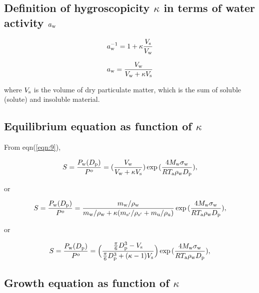 \documentclass[12pt]{article}
\begin{document}
\subsection{Definition of hygroscopicity $\kappa$ in terms of water activity $a_{\rm w}$}

\begin{equation}\label{eqn:17}
a_{\rm w}^{-1}=1+\kappa \frac{V_{\rm s}}{V_{\rm w}}
\end{equation}

\begin{equation}\label{eqn:18}
a_{\rm w}=\frac{V_{\rm w}}{V_{\rm w} + \kappa V_{\rm s}}
\end{equation}

where $V_{\rm s}$ is the volume of dry particulate matter, which is the sum of soluble (solute) and insoluble material.


\subsection{Equilibrium equation as function of $\kappa$}

From eqn(\ref{eqn:9}),

\begin{equation}\label{eqn:19}
S=\frac{P_{\rm w}(D_{\rm p})}{P^{o}}=(\frac{V_{\rm w}}{V_{\rm w} + \kappa V_{\rm s}})   \exp{(\frac{4 M_{\rm w} \sigma_{\rm w}}{R T_{\rm a} \rho_{\rm w} D_{\rm p}})},
\end{equation}

or 

\begin{equation}\label{eqn:20}
S=\frac{P_{\rm w}(D_{\rm p})}{P^{o}}=\frac{m_{\rm w}/ \rho_{\rm w}} {m_{\rm w}/\rho_{\rm w} + \kappa (m_{\rm s'}/\rho_{\rm s'} + m_{\rm u}/\rho_{\rm u})}\exp{(\frac{4 M_{\rm w} \sigma_{\rm w}}{R T_{\rm a} \rho_{\rm w} D_{\rm p}})},
\end{equation}

or 

\begin{equation}\label{eqn:21}
S=\frac{P_{\rm w}(D_{\rm p})}{P^{o}}=\Big(\frac{\frac{\pi}{6}D_{\rm p}^{3}-V_{\rm s}}{\frac{\pi}{6}D_{\rm p}^{3}+(\kappa-1)V_{\rm s}} \Big)\exp{(\frac{4 M_{\rm w} \sigma_{\rm w}}{R T_{\rm a} \rho_{\rm w} D_{\rm p}})},
\end{equation}


\subsection{Growth equation as function of $\kappa$ }
\end{document}
